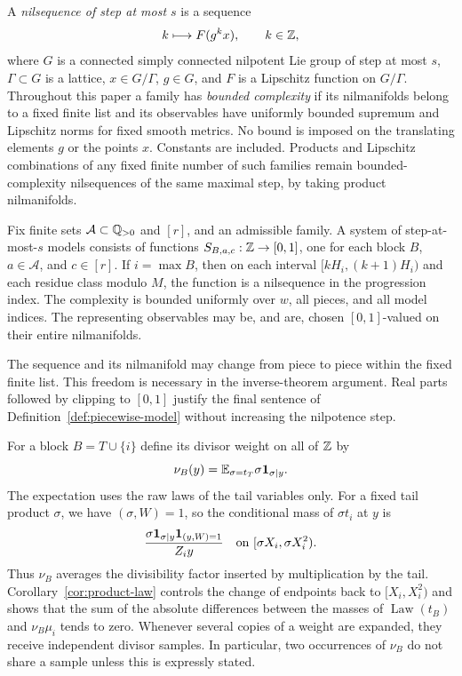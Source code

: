 A \emph{nilsequence of step at most $s$} is a sequence
\begin{equation}\label{eq:nilsequence-definition}
 k\longmapsto F(g^k x),\qquad k\in\mathbb Z,
\end{equation}
where $G$ is a connected simply connected nilpotent Lie group of step
at most $s$, $\Gamma\subset G$ is a lattice, $x\in G/\Gamma$, $g\in G$,
and $F$ is a Lipschitz function on $G/\Gamma$.
Throughout this paper a family has \emph{bounded complexity} if its
nilmanifolds belong to a fixed finite list and its observables have
uniformly bounded supremum and Lipschitz norms for fixed smooth metrics.
No bound is imposed on the translating elements $g$ or the points $x$.
Constants are included. Products and Lipschitz combinations of any
fixed finite number of such families remain bounded-complexity
nilsequences of the same maximal step, by taking product nilmanifolds.

\begin{definition}\label{def:piecewise-model}
Fix finite sets $\mathcal A\subset\mathbb Q_{>0}$ and $[r]$, and an admissible
family. A system of step-at-most-$s$ models consists of functions
$S_{B,a,c}:\mathbb Z\to[0,1]$, one for each block $B$, $a\in\mathcal A$,
and $c\in[r]$. If $i=\max B$, then on each interval
$[kH_i,(k+1)H_i)$ and each residue class modulo $M$, the function is a
nilsequence in the progression index. The complexity is bounded
uniformly over $w$, all pieces, and all model indices. The representing
observables may be, and are, chosen $[0,1]$-valued on their entire
nilmanifolds.
\end{definition}

The sequence and its nilmanifold may change from piece to piece within
the fixed finite list. This freedom is necessary in the inverse-theorem
argument. Real parts followed by clipping to $[0,1]$ justify the final
sentence of Definition~\ref{def:piecewise-model} without increasing the
nilpotence step.

For a block $B=T\cup\{i\}$ define its divisor weight on all of $\mathbb Z$ by
\begin{equation}\label{eq:divisor-weight}
 \nu_B(y)=\mathbb E_{\sigma=t_T}\sigma\mathbf 1_{\sigma\mid y}.
\end{equation}
The expectation uses the raw laws of the tail variables only.
For a fixed tail product $\sigma$, we have $(\sigma,W)=1$, so
the conditional mass of $\sigma t_i$ at $y$ is
\[
 \frac{\sigma\mathbf 1_{\sigma\mid y}\mathbf 1_{(y,W)=1}}{Z_i y}
 \quad\text{on }[\sigma X_i,\sigma X_i^2).
\]
Thus $\nu_B$ averages the divisibility factor inserted by multiplication
by the tail. Corollary~\ref{cor:product-law} controls the change of
endpoints back to $[X_i,X_i^2)$ and shows that the sum of the absolute
differences between the masses of $\operatorname{Law}(t_B)$ and
$\nu_B\mu_i$ tends to zero.
Whenever several copies of a weight are expanded, they receive
independent divisor samples. In particular, two occurrences of
$\nu_B$ do not share a sample unless this is expressly stated.

